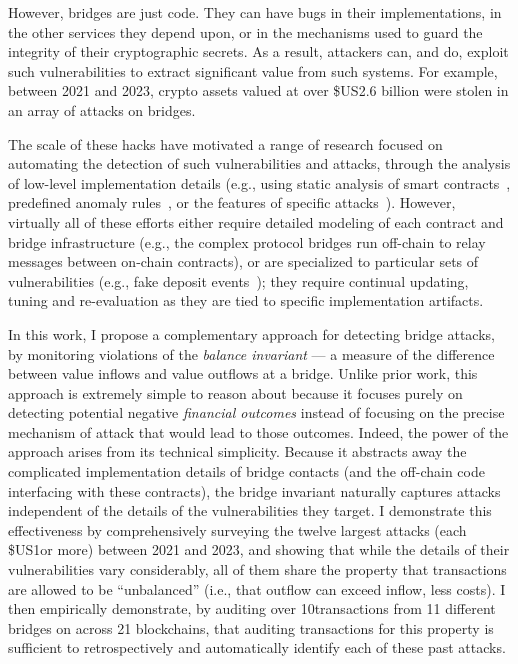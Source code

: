 However, bridges are just code.  They can have bugs in their
implementations, in the other services they depend upon, or in the
mechanisms used to guard the integrity of their cryptographic secrets.
As a result, attackers can, and do, exploit such vulnerabilities to
extract significant value from such systems.  For example, between
2021 and 2023, crypto assets valued at over \$US2.6 billion were
stolen in an array of attacks on bridges. 

The scale of these hacks have motivated a range of research
focused on automating the detection of such vulnerabilities and
attacks, through the analysis of low-level implementation details
(e.g., using static analysis of smart
contracts~\cite{wang2024xguard,liao2024smartaxe}, predefined anomaly
rules~\cite{zhang2022xscope}, or the features of specific
attacks~\cite{lin2024detecting}).  However, virtually all of these
efforts either require detailed modeling of each contract and bridge infrastructure (e.g.,
the complex protocol bridges run off-chain to relay messages between on-chain contracts),
or are specialized to particular sets of vulnerabilities (e.g., fake deposit events~\cite{lin2024detecting}); they require
continual updating, tuning and re-evaluation as they are tied to
specific implementation artifacts.

In this work, I propose a complementary approach for detecting bridge
attacks, by monitoring violations of the \emph{balance invariant}
--- a measure of the difference between value inflows and value
outflows at a bridge. Unlike prior work, this approach is extremely
simple to reason about because it focuses purely on detecting
potential negative \emph{financial outcomes} instead of focusing on
the precise mechanism of attack that would lead to those outcomes.
Indeed, the power of the approach arises from its technical
simplicity.  Because it abstracts away the complicated implementation
details of bridge contacts (and the off-chain code interfacing with these contracts), the bridge invariant naturally captures 
attacks independent of the details of the vulnerabilities
they target.  I demonstrate this effectiveness by comprehensively
surveying the twelve largest attacks (each \$US1\mil or more) between
2021 and 2023, and showing that while the details of their
vulnerabilities vary considerably, all of them share the property that
transactions are allowed to be ``unbalanced'' (i.e., that outflow can
exceed inflow, less costs).
I then empirically demonstrate, by auditing over 10\mil transactions from 11 different bridges on across 21 blockchains, that auditing transactions for this
property is sufficient to retrospectively and automatically identify
each of these past attacks.  

